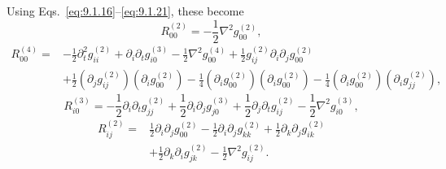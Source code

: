Using Eqs.~\eqref{eq:9.1.16}--\eqref{eq:9.1.21}, these become
\begin{equation}
  R_{00}^{(2)}=-\frac12\nabla^2 g_{00}^{(2)},
  \tag{9.1.30}\label{eq:9.1.30}
\end{equation}
\begin{equation}
  \begin{split}
  R_{00}^{(4)}={}&
  -\frac12\partial_t^2g_{ii}^{(2)}
  +\partial_i\partial_tg_{i0}^{(3)}
  -\frac12\nabla^2g_{00}^{(4)}
  +\frac12g_{ij}^{(2)}\partial_i\partial_jg_{00}^{(2)}
  \\
  &+\frac12(\partial_jg_{ij}^{(2)})(\partial_i g_{00}^{(2)})
  -\frac14(\partial_i g_{00}^{(2)})(\partial_i g_{00}^{(2)})
  -\frac14(\partial_i g_{00}^{(2)})(\partial_i g_{jj}^{(2)}),
  \end{split}
  \tag{9.1.31}\label{eq:9.1.31}
\end{equation}
\begin{equation}
  R_{i0}^{(3)}
  =
  -\frac12\partial_i\partial_tg_{jj}^{(2)}
  +\frac12\partial_i\partial_jg_{j0}^{(3)}
  +\frac12\partial_j\partial_tg_{ij}^{(2)}
  -\frac12\nabla^2g_{i0}^{(3)},
  \tag{9.1.32}\label{eq:9.1.32}
\end{equation}
\begin{equation}
  \begin{split}
  R_{ij}^{(2)}={}&
  \frac12\partial_i\partial_jg_{00}^{(2)}
  -\frac12\partial_i\partial_jg_{kk}^{(2)}
  +\frac12\partial_k\partial_jg_{ik}^{(2)}
  \\
  &+\frac12\partial_k\partial_i g_{jk}^{(2)}
  -\frac12\nabla^2g_{ij}^{(2)}.
  \end{split}
  \tag{9.1.33}\label{eq:9.1.33}
\end{equation}

